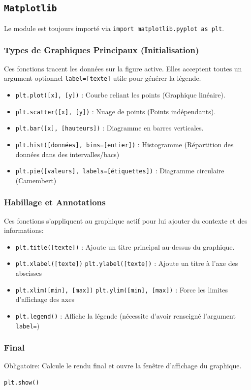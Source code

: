 \subsection{\texttt{Matplotlib}}

Le module est toujours importé via \texttt{import matplotlib.pyplot as plt}.

\subsubsection{Types de Graphiques Principaux (Initialisation)}

Ces fonctions tracent les données sur la figure active. Elles acceptent toutes un argument optionnel \texttt{label=[texte]} utile pour générer la légende.

\begin{itemize}
\item \texttt{plt.plot([x], [y])} : Courbe reliant les points (Graphique linéaire).
\item \texttt{plt.scatter([x], [y])} : Nuage de points (Points indépendants).
\item \texttt{plt.bar([x], [hauteurs])} : Diagramme en barres verticales.
\item \texttt{plt.hist([données], bins=[entier])} : Histogramme (Répartition des données dans des intervalles/bacs)
\item \texttt{plt.pie([valeurs], labels=[étiquettes])} : Diagramme circulaire (Camembert)
\end{itemize}

\subsubsection{Habillage et Annotations}

Ces fonctions s'appliquent au graphique actif pour lui ajouter du contexte et des informations:

\begin{itemize}
\item \texttt{plt.title([texte])} : Ajoute un titre principal au-dessus du graphique.
\item \texttt{plt.xlabel([texte])} \texttt{plt.ylabel([texte])} : Ajoute un titre à l'axe des abscisses
\item \texttt{plt.xlim([min], [max])} \texttt{plt.ylim([min], [max])} : Force les limites d'affichage des axes
\item \texttt{plt.legend()} : Affiche la légende (nécessite d'avoir renseigné l'argument \texttt{label=})
\end{itemize}

\subsubsection{Final}

Obligatoire: Calcule le rendu final et ouvre la fenêtre d'affichage du graphique.

\begin{verbatim}
plt.show()
\end{verbatim}